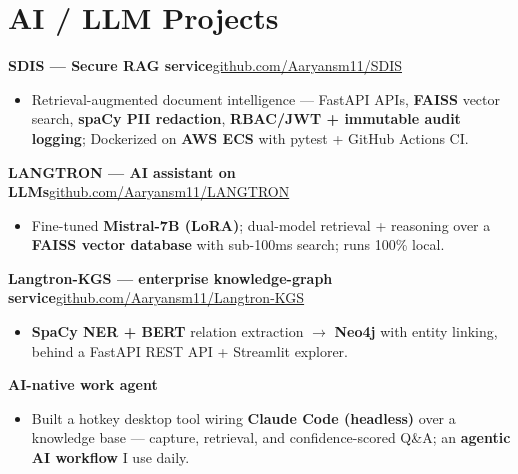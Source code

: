\documentclass[10pt,a4paper]{article}
\begin{document}
\section*{AI / LLM Projects}
\vspace{1pt}\textbf{SDIS --- Secure RAG service}\hfill {\small\href{https://github.com/Aaryansm11/SDIS}{github.com/Aaryansm11/SDIS}}
\begin{itemize}
\item Retrieval-augmented document intelligence --- FastAPI APIs, \textbf{FAISS} vector search, \textbf{spaCy PII redaction}, \textbf{RBAC/JWT + immutable audit logging}; Dockerized on \textbf{AWS ECS} with pytest + GitHub Actions CI.
\end{itemize}
\vspace{1pt}\textbf{LANGTRON --- AI assistant on LLMs}\hfill {\small\href{https://github.com/Aaryansm11/LANGTRON}{github.com/Aaryansm11/LANGTRON}}
\begin{itemize}
\item Fine-tuned \textbf{Mistral-7B (LoRA)}; dual-model retrieval + reasoning over a \textbf{FAISS vector database} with sub-100ms search; runs 100\% local.
\end{itemize}
\vspace{1pt}\textbf{Langtron-KGS --- enterprise knowledge-graph service}\hfill {\small\href{https://github.com/Aaryansm11/Langtron-KGS}{github.com/Aaryansm11/Langtron-KGS}}
\begin{itemize}
\item \textbf{SpaCy NER + BERT} relation extraction $\rightarrow$ \textbf{Neo4j} with entity linking, behind a FastAPI REST API + Streamlit explorer.
\end{itemize}
\vspace{1pt}\textbf{AI-native work agent}
\begin{itemize}
\item Built a hotkey desktop tool wiring \textbf{Claude Code (headless)} over a knowledge base --- capture, retrieval, and confidence-scored Q\&A; an \textbf{agentic AI workflow} I use daily.
\end{itemize}
\end{document}
